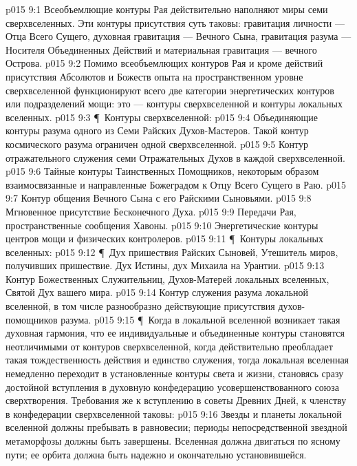 \vs p015 9:1 Всеобъемлющие контуры Рая действительно наполняют миры семи сверхвселенных. Эти контуры присутствия суть таковы: гравитация личности --- Отца Всего Сущего, духовная гравитация --- Вечного Сына, гравитация разума --- Носителя Объединенных Действий и материальная гравитация --- вечного Острова.
\vs p015 9:2 Помимо всеобъемлющих контуров Рая и кроме действий присутствия Абсолютов и Божеств опыта на пространственном уровне сверхвселенной функционируют всего две категории энергетических контуров или подразделений мощи: это --- контуры сверхвселенной и контуры локальных вселенных.
\vs p015 9:3 \P\ Контуры сверхвселенной:
\vs p015 9:4 \bibnobreakspace Объединяющие контуры разума одного из Семи Райских Духов\hyp{}Мастеров. Такой контур космического разума ограничен одной сверхвселенной.
\vs p015 9:5 \bibnobreakspace Контур отражательного служения семи Отражательных Духов в каждой сверхвселенной.
\vs p015 9:6 \bibnobreakspace Тайные контуры Таинственных Помощников, некоторым образом взаимосвязанные и направленные Божеградом к Отцу Всего Сущего в Раю.
\vs p015 9:7 \bibnobreakspace Контур общения Вечного Сына с его Райскими Сыновьями.
\vs p015 9:8 \bibnobreakspace Мгновенное присутствие Бесконечного Духа.
\vs p015 9:9 \bibnobreakspace Передачи Рая, пространственные сообщения Хавоны.
\vs p015 9:10 \bibnobreakspace Энергетические контуры центров мощи и физических контролеров.
\vs p015 9:11 \P\ Контуры локальных вселенных:
\vs p015 9:12 \P\ \bibnobreakspace Дух пришествия Райских Сыновей, Утешитель миров, получивших пришествие. Дух Истины, дух Михаила на Урантии.
\vs p015 9:13 \bibnobreakspace Контур Божественных Служительниц, Духов\hyp{}Матерей локальных вселенных, Святой Дух вашего мира.
\vs p015 9:14 \bibnobreakspace Контур служения разума локальной вселенной, в том числе разнообразно действующие присутствия духов\hyp{}помощников разума.
\vs p015 9:15 \P\ Когда в локальной вселенной возникает такая духовная гармония, что ее индивидуальные и объединенные контуры становятся неотличимыми от контуров сверхвселенной, когда действительно преобладает такая тождественность действия и единство служения, тогда локальная вселенная немедленно переходит в установленные контуры света и жизни, становясь сразу достойной вступления в духовную конфедерацию усовершенствованного союза сверхтворения. Требования же к вступлению в советы Древних Дней, к членству в конфедерации сверхвселенной таковы:
\vs p015 9:16 \bibnobreakspace {} Звезды и планеты локальной вселенной должны пребывать в равновесии; периоды непосредственной звездной метаморфозы должны быть завершены. Вселенная должна двигаться по ясному пути; ее орбита должна быть надежно и окончательно установившейся.
